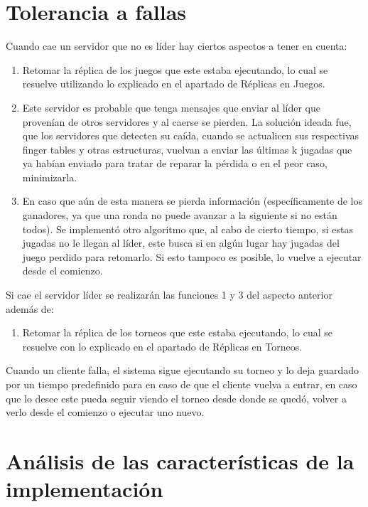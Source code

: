 \documentclass[10pt, a4paper]{article}
\begin{document}
    \section{Tolerancia a fallas}
    Cuando cae un servidor que no es líder hay ciertos aspectos a tener en cuenta:
    \begin{enumerate}
    	\item Retomar la réplica de los juegos que este estaba ejecutando, lo cual se resuelve utilizando lo explicado en el apartado de Réplicas en Juegos.
    	\item Este servidor es probable que tenga mensajes que enviar al líder que provenían de otros servidores y al caerse se pierden. La solución ideada fue, que los servidores que detecten su caída, cuando se actualicen sus respectivas finger tables y otras estructuras, vuelvan a enviar las últimas k jugadas que ya habían enviado para tratar de reparar la pérdida o en el peor caso, minimizarla.
    	\item En caso que aún de esta manera se pierda información (específicamente de los ganadores, ya que una ronda no puede avanzar a la siguiente si no están todos). Se implementó otro algoritmo que, al cabo de cierto tiempo, si estas jugadas no le llegan al líder, este busca si en algún lugar hay jugadas del juego perdido para retomarlo. Si esto tampoco es posible, lo vuelve a ejecutar desde el comienzo.
    \end{enumerate}
    
    Si cae el servidor líder se realizarán las funciones 1 y 3 del aspecto anterior además de:
    \begin{enumerate}
    	\item Retomar la réplica de los torneos que este estaba ejecutando, lo cual se resuelve con lo explicado en el apartado de Réplicas en Torneos.
    \end{enumerate}
    
    Cuando un cliente falla, el sistema sigue ejecutando su torneo y lo deja guardado por un tiempo predefinido para en caso de que el cliente vuelva a entrar, en caso que lo desee este pueda seguir viendo el torneo desde donde se quedó, volver a verlo desde el comienzo o ejecutar uno nuevo.
    
    \section{An\'alisis de las caracter\'isticas de la implementaci\'on}
    
\end{document}
